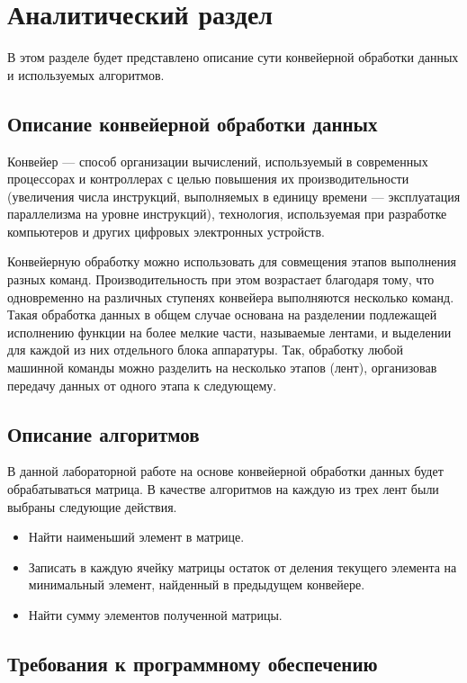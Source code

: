 \chapter{Аналитический раздел}\label{analyth}
В этом разделе будет представлено описание сути конвейерной обработки данных и используемых алгоритмов.

\section{Описание конвейерной обработки данных}

Конвейер \cite{conv} — способ организации вычислений, используемый в современных процессорах и контроллерах с целью повышения их производительности (увеличения числа инструкций, выполняемых в единицу времени — эксплуатация параллелизма на уровне инструкций), технология, используемая при разработке компьютеров и других цифровых электронных устройств.

Конвейерную обработку можно использовать для совмещения этапов выполнения разных команд. Производительность при этом возрастает благодаря тому, что одновременно на различных ступенях конвейера выполняются несколько команд. Такая обработка данных в общем случае основана на разделении подлежащей исполнению функции на более мелкие части, называемые лентами, и выделении для каждой из них отдельного блока аппаратуры. Так, обработку любой машинной команды можно разделить на несколько этапов (лент), организовав передачу данных от одного этапа к следующему.

\section{Описание алгоритмов}

В данной лабораторной работе на основе конвейерной обработки данных будет обрабатываться матрица. В качестве алгоритмов на каждую из трех лент были выбраны следующие действия.

\begin{itemize}
    \item Найти наименьший элемент в матрице.
    \item Записать в каждую ячейку матрицы остаток от деления текущего элемента на минимальный элемент, найденный в предыдущем конвейере.
    \item Найти сумму элементов полученной матрицы.
\end{itemize}

\section{Требования к программному обеспечению}


